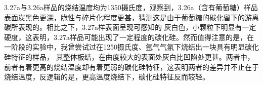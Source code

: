 3.27a与3.26a样品的烧结温度均为1350摄氏度，观察到，3.26a（含有葡萄糖）样品表面炭黑色更深，脆性与碎片化程度更甚，猜测这是由于葡萄糖的碳化留下的游离碳所表现的。相比之下，3.27a样表面呈现可感知的
灰白色，小颗粒下明显有一定硬度，这表明，3.27a样品可能出现了一定程度的碳化硅。然而值得注意的是，在一阶段的实验中，我曾尝试过在1250摄氏度、氩气气氛下烧结出一块具有明显碳化硅特征的样品，
其整体板结，在曲度较大的表面处灰白比凹陷处更甚。两者中，前者有着更高的烧结温度却有着更弱的碳化硅特征，这表明两者的差异并不止在于烧结温度，反逻辑的是，更高温度烧结下，碳化硅特征反而较轻。
